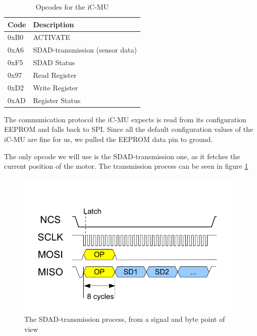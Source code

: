 \begin{table}[H]
    \begin{tabular}{|l|l|}
        \hline
        Code & Description                     \\ \hline
        0xB0 & ACTIVATE                        \\ \hline
        0xA6 & SDAD-transmission (sensor data) \\ \hline
        0xF5 & SDAD Status                     \\ \hline
        0x97 & Read Register                   \\ \hline
        0xD2 & Write Register                  \\ \hline
        0xAD & Register Status                 \\ \hline
    \end{tabular}
    \caption{Opcodes for the iC-MU}
    \label{tab:opcodes}
\end{table}

The communication protocol the iC-MU expects is read from its configuration EEPROM and falls back to SPI.
Since all the default configuration values of the iC-MU are fine for us, we pulled the EEPROM data pin to ground.

The only opcode we will use is the SDAD-transmission one, as it fetches the current position of the motor.
The transmission process can be seen in figure \ref{fig:background:sdad}

\begin{figure}[H]
    \includegraphics[width=.8\textwidth]{assets/sdad-transmission.png}
    \caption{The SDAD-transmission process, from a signal and byte point of view \cite[p. 37]{IC-MU}}
    \label{fig:background:sdad}
\end{figure}

